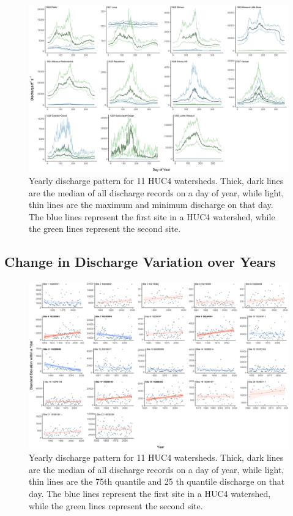 \documentclass[12pt,]{article}
\makeatletter
\def\maxwidth{\ifdim\Gin@nat@width>\linewidth\linewidth\else\Gin@nat@width\fi}
\makeatother
\begin{document}
\begin{figure}
\includegraphics[width=\maxwidth]{../Figures/discharge} \caption{\label{fig:dispattern}Yearly discharge pattern for 11 HUC4 watersheds. Thick, dark lines are the median of all discharge records on a day of year, while light, thin lines are the maximum and minimum discharge on that day. The blue lines represent the first site in a HUC4 watershed, while the green lines represent the second site.}\label{fig:dispattern}
\end{figure}

\hypertarget{change-in-discharge-variation-over-years}{%
\subsection{Change in Discharge Variation over
Years}\label{change-in-discharge-variation-over-years}}

\begin{figure}
\includegraphics[width=\maxwidth]{../Figures/sd_year} \caption{\label{fig:dispattern2}Yearly discharge pattern for 11 HUC4 watersheds. Thick, dark lines are the median of all discharge records on a day of year, while light, thin lines are the 75th quantile and 25 th quantile discharge on that day. The blue lines represent the first site in a HUC4 watershed, while the green lines represent the second site.}\label{fig:dispattern2}
\end{figure}
\end{document}
